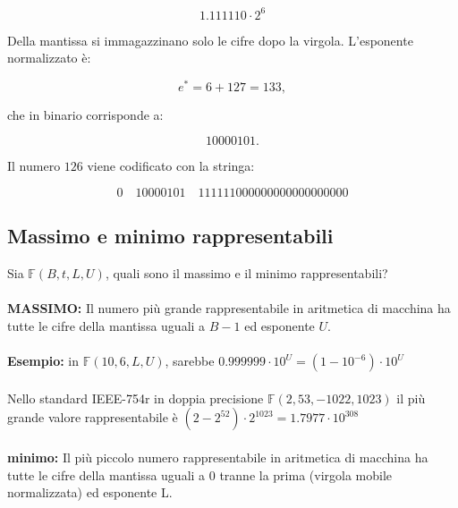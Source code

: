 \documentclass[a4paper, 11pt]{article}
\begin{document}
        \[
            1.111110 \cdot 2^6
        \]


        Della mantissa si immagazzinano solo le cifre dopo la virgola.
        L'esponente normalizzato è:
            

        \[
            e^{*} = 6 + 127 = 133,
        \]


        che in binario corrisponde a:
            

        \[
            10000101.
        \]


        Il numero \( 126 \) viene codificato con la stringa:
            

        \[
            0 \quad 10000101 \quad 111111000000000000000000
        \]



        \subsection{Massimo e minimo rappresentabili}
        Sia $\mathbb{F}(B, t, L, U)$, quali sono il massimo e il minimo rappresentabili?

        \paragraph{}
        \textbf{MASSIMO: }
        Il numero più grande rappresentabile in aritmetica di macchina ha tutte le cifre della mantissa uguali a $B-1$ ed esponente $U$.

        \paragraph{}
        \textbf{Esempio: } in $\mathbb{F}(10, 6, L, U)$, sarebbe $0.999999\cdot10^U = (1-10^{-6}) \cdot 10^U$

        \paragraph{} Nello standard IEEE-754r in doppia precisione $\mathbb{F}(2, 53, -1022, 1023)$ il più grande valore rappresentabile è $(2-2^{52})\cdot2^1023 = 1.7977 \cdot 10^{308}$
        
        \paragraph{}
        \textbf{minimo: }
        Il più piccolo numero rappresentabile in aritmetica di macchina ha tutte le cifre della mantissa uguali a 0 tranne la prima (virgola mobile normalizzata) ed esponente L.
        
\end{document}
